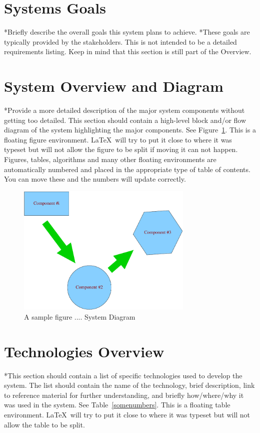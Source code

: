 \section{Systems Goals}
*Briefly describe the overall goals this system plans to achieve.
*These goals are typically provided by the stakeholders.  This is not
intended to be a detailed requirements listing.  Keep in mind that
this section is still part of the Overview.

\section{System Overview and Diagram}
*Provide a more detailed description of the major system components
without getting too detailed.  This section should contain a
high-level block and/or flow diagram of the system highlighting the
major components.  See Figure~\ref{systemdiagram}.  This is a floating
figure environment.  \LaTeX\ will try to put it close to where it was
typeset but will not allow the figure to be split if moving it can not
happen.  Figures, tables, algorithms and many other floating
environments are automatically numbered and placed in the appropriate
type of table of contents.  You can move these and the numbers will
update correctly.

\begin{figure}[tbh]
\begin{center}
\includegraphics[width=0.75\textwidth]{./diagram}
\end{center}
\caption{A sample figure .... System Diagram \label{systemdiagram}}
\end{figure}

\section{Technologies Overview}
*This section should contain a list of specific technologies used to
develop the system.  The list should contain the name of the
technology, brief description, link to reference material for further
understanding, and briefly how/where/why it was used in the system.
See Table~\ref{somenumbers}.  This is a floating table environment.
\LaTeX\ will try to put it close to where it was typeset but will not
allow the table to be split.

